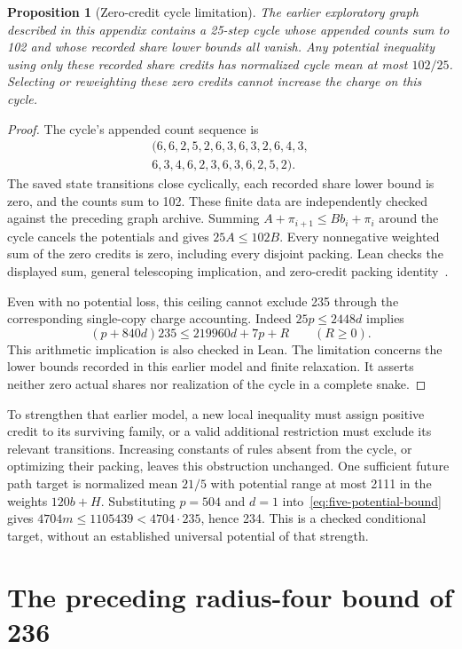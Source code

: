 \documentclass[11pt,a4paper]{article}
\newtheorem{proposition}[theorem]{Proposition}
\theoremstyle{definition}
\theoremstyle{remark}
\begin{document}
\begin{proposition}[Zero-credit cycle limitation]\label{prop:zero-credit}
The earlier exploratory graph described in this appendix contains a 25-step cycle whose appended counts sum to 102 and whose recorded share lower bounds all vanish. Any potential inequality using only these recorded share credits has normalized cycle mean at most $102/25$. Selecting or reweighting these zero credits cannot increase the charge on this cycle.
\end{proposition}
\begin{proof}
The cycle's appended count sequence is
\[
\begin{gathered}
(6,6,2,5,2,6,3,6,3,2,6,4,3,\\
6,3,4,6,2,3,6,3,6,2,5,2).
\end{gathered}
\]
The saved state transitions close cyclically, each recorded share lower bound is zero, and the counts sum to 102. These finite data are independently checked against the preceding graph archive. Summing $A+\pi_{i+1}\le B b_i+\pi_i$ around the cycle cancels the potentials and gives $25A\le102B$. Every nonnegative weighted sum of the zero credits is zero, including every disjoint packing. Lean checks the displayed sum, general telescoping implication, and zero-credit packing identity~\cite{packingarchive}.

Even with no potential loss, this ceiling cannot exclude 235 through the corresponding single-copy charge accounting. Indeed $25p\le2448d$ implies
\[
(p+840d)235\le219960d+7p+R\qquad(R\ge0).
\]
This arithmetic implication is also checked in Lean. The limitation concerns the lower bounds recorded in this earlier model and finite relaxation. It asserts neither zero actual shares nor realization of the cycle in a complete snake.
\end{proof}

To strengthen that earlier model, a new local inequality must assign positive credit to its surviving family, or a valid additional restriction must exclude its relevant transitions. Increasing constants of rules absent from the cycle, or optimizing their packing, leaves this obstruction unchanged. One sufficient future path target is normalized mean $21/5$ with potential range at most 2111 in the weights $120b+H$. Substituting $p=504$ and $d=1$ into~\eqref{eq:five-potential-bound} gives $4704m\le1105439<4704\cdot235$, hence 234. This is a checked conditional target, without an established universal potential of that strength.


\section{The preceding radius-four bound of 236}\label{app:bound236}
\end{document}
